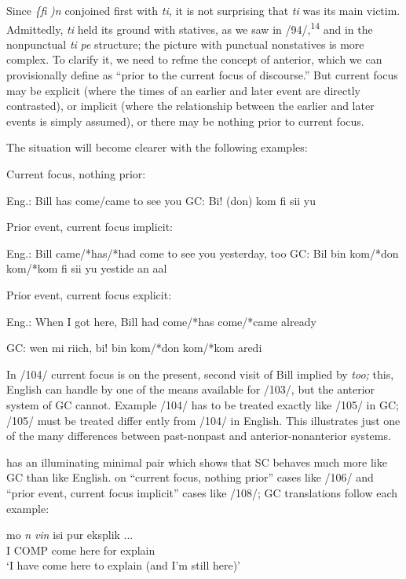 Since \textit{\{}\textit{fi} \textit{)n }conjoined first with \textit{ti,} it is not surprising that \textit{ti} was
its main victim. Admittedly, \textit{ti} held its ground with statives, as we saw in /94/,\textsuperscript{1}\textsuperscript{4} and in the nonpunctual \textit{ti} \textit{pe} structure; the picture with punctual nonstatives is more complex. To clarify it, we need to refme the concept of anterior, which we can provisionally define as ``prior to the current focus of discourse.'' But current focus may be explicit (where the times of an earlier and later event are directly contrasted),
or implicit (where the relationship between the earlier and later events is simply assumed), or there may be nothing prior to current focus.

The situation will become clearer with the following examples:

\ea\label{ex:2:103}
 Current focus, nothing prior:

Eng.: Bill has come/came to see you GC: Bi! (don) kom fi sii yu

\z

\ea\label{ex:2:104}
 Prior event, current focus implicit:

Eng.: Bill came/*has/*had come to see you yesterday, too GC: Bil bin kom/*don kom/*kom fi sii yu yestide an aal

\z


\ea\label{ex:2:105}
 Prior event, current focus explicit:

Eng.: When I got here, Bill had come/*has come/*came already

GC: wen mi riich, bi! bin kom/*don kom/*kom aredi


\z


In /104/ current focus is on the present, second visit of Bill implied by \textit{too;} this, English can handle by one of the means available for /103/, but the anterior system of GC cannot. Example /104/ has to be treated exactly like /105/ in GC; /105/ must be treated differ%
ently from /104/ in English. This illustrates just one of the many differences between past-nonpast and anterior-nonanterior systems.

\citet[107]{Corne1977} has an illuminating minimal pair which shows that SC behaves much more like GC than like English. on ``current focus, nothing prior'' cases like /106/ and ``prior event, current focus implicit'' cases like /108/; GC translations follow each example:

\ea\label{ex:2:106}
\gll mo \textit{n} \textit{vin} isi pur eksplik ...\\
I COMP come here for explain\\
\glt `I have come here to explain (and I'm still here)'
\z





